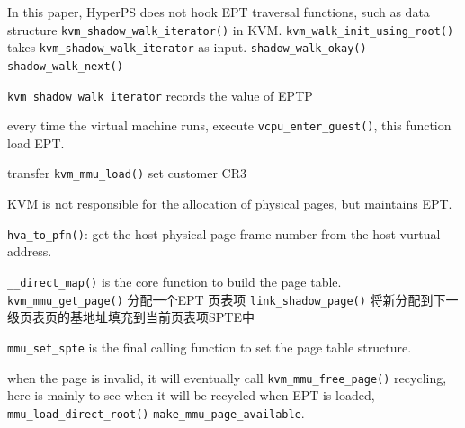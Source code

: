 In this paper, HyperPS does not hook EPT traversal functions, such as data structure \verb|kvm_shadow_walk_iterator()| in KVM. 
\verb|kvm_walk_init_using_root()| takes \verb|kvm_shadow_walk_iterator| as input. 
\verb|shadow_walk_okay()| \verb|shadow_walk_next()|

\verb|kvm_shadow_walk_iterator| records the value of EPTP

every time the virtual machine runs, execute \verb|vcpu_enter_guest()|, this function load EPT.

transfer \verb|kvm_mmu_load()| set customer CR3

KVM is not responsible for the allocation of physical pages, but maintains EPT. 

\verb|hva_to_pfn()|: get the host physical page frame number from the host vurtual address.

\verb|__direct_map()| is the core function to build the page table.
\verb|kvm_mmu_get_page()| 分配一个EPT 页表项 
\verb|link_shadow_page()| 将新分配到下一级页表页的基地址填充到当前页表项SPTE中

\verb|mmu_set_spte| is the final calling function to set the page table structure. 

when the page is invalid, it will eventually call \verb|kvm_mmu_free_page()| recycling, here is mainly to see when it will be recycled
when EPT is loaded, \verb|mmu_load_direct_root()| \verb|make_mmu_page_available|.
\fi



